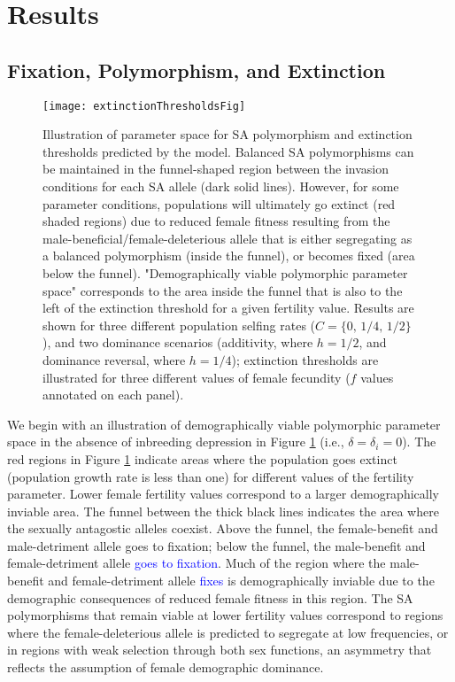 \documentclass[11pt]{article}
\begin{document}

\section*{Results}\label{sec:Results}

\subsection*{Fixation, Polymorphism, and Extinction}\label{subsec:PolyExt}


 \begin{figure}[htbp]
 \centering
 \texttt{[image: extinctionThresholdsFig]}
 \caption{\footnotesize{Illustration of parameter space for SA polymorphism and extinction thresholds predicted by the model. Balanced SA polymorphisms can be maintained in the funnel-shaped region between the invasion conditions for each SA allele (dark solid lines). However, for some parameter conditions, populations will ultimately go extinct (red shaded regions) due to reduced female fitness resulting from the male-beneficial/female-deleterious allele that is either segregating as a balanced polymorphism (inside the funnel), or becomes fixed (area below the funnel). "Demographically viable polymorphic parameter space" corresponds to the area inside the funnel that is also to the left of the extinction threshold for a given fertility value. Results are shown for three different population selfing rates ($C = \{0,\,1/4,\,1/2\}$), and two dominance scenarios (additivity, where $h = 1/2$, and dominance reversal, where $h = 1/4$); extinction thresholds are illustrated for three different values of female fecundity ($f$ values annotated on each panel).}}
 \label{fig:extThresholds}
 \end{figure}

We begin with an illustration of demographically viable polymorphic parameter space in the absence of inbreeding depression in Figure \ref{fig:extThresholds} (i.e., $\delta = \delta_i = 0$). The red regions in Figure \ref{fig:extThresholds} indicate areas where the population goes extinct (population growth rate is less than one) for different values of the fertility parameter. Lower female fertility values correspond to a larger demographically inviable area. The funnel between the thick black lines indicates the area where the sexually antagostic alleles coexist. Above the funnel, the female-benefit and male-detriment allele goes to fixation; below the funnel, the male-benefit and female-detriment allele \textcolor{blue}{goes to fixation}. Much of the region where the male-benefit and female-detriment allele \textcolor{blue}{fixes} is demographically inviable due to the demographic consequences of reduced female fitness in this region. The SA polymorphisms that remain viable at lower fertility values correspond to regions where the female-deleterious allele is predicted to segregate at low frequencies, or in regions with weak selection through both sex functions, an asymmetry that reflects the assumption of female demographic dominance.
\end{document}

